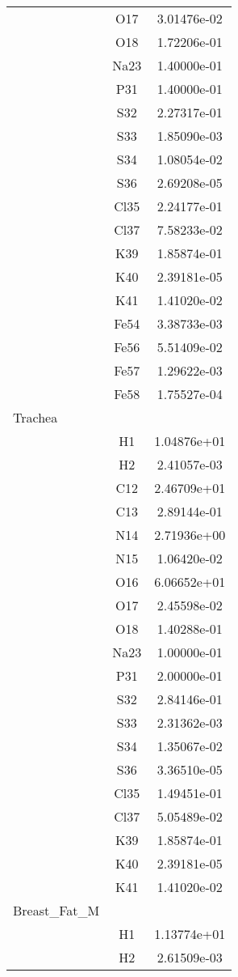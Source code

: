 \begin{centering}
\begin{longtable}{l c c}
& O17 & 3.01476e-02 \\ 
& O18 & 1.72206e-01 \\ 
& Na23 & 1.40000e-01 \\ 
& P31 & 1.40000e-01 \\ 
& S32 & 2.27317e-01 \\ 
& S33 & 1.85090e-03 \\ 
& S34 & 1.08054e-02 \\ 
& S36 & 2.69208e-05 \\ 
& Cl35 & 2.24177e-01 \\ 
& Cl37 & 7.58233e-02 \\ 
& K39 & 1.85874e-01 \\ 
& K40 & 2.39181e-05 \\ 
& K41 & 1.41020e-02 \\ 
& Fe54 & 3.38733e-03 \\ 
& Fe56 & 5.51409e-02 \\ 
& Fe57 & 1.29622e-03 \\ 
& Fe58 & 1.75527e-04 \\ 
\hline
Trachea & & \\
\hline
& H1 & 1.04876e+01 \\ 
& H2 & 2.41057e-03 \\ 
& C12 & 2.46709e+01 \\ 
& C13 & 2.89144e-01 \\ 
& N14 & 2.71936e+00 \\ 
& N15 & 1.06420e-02 \\ 
& O16 & 6.06652e+01 \\ 
& O17 & 2.45598e-02 \\ 
& O18 & 1.40288e-01 \\ 
& Na23 & 1.00000e-01 \\ 
& P31 & 2.00000e-01 \\ 
& S32 & 2.84146e-01 \\ 
& S33 & 2.31362e-03 \\ 
& S34 & 1.35067e-02 \\ 
& S36 & 3.36510e-05 \\ 
& Cl35 & 1.49451e-01 \\ 
& Cl37 & 5.05489e-02 \\ 
& K39 & 1.85874e-01 \\ 
& K40 & 2.39181e-05 \\ 
& K41 & 1.41020e-02 \\ 
\hline
Breast_Fat_M & & \\
\hline
& H1 & 1.13774e+01 \\ 
& H2 & 2.61509e-03 \\ 

\end{longtable}
\end{centering}
